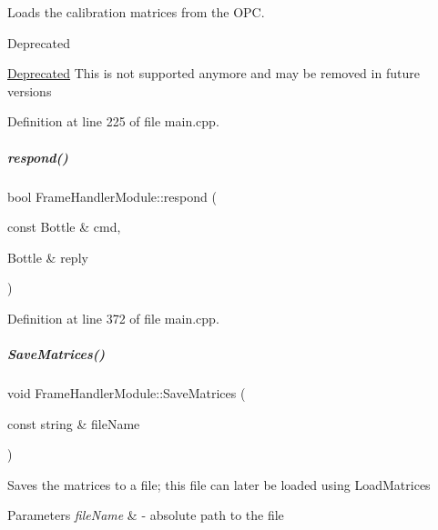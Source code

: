 Loads the calibration matrices from the O\+PC. 

\begin{DoxyRefDesc}{Deprecated}
\item[\hyperlink{deprecated__deprecated000001}{Deprecated}]This is not supported anymore and may be removed in future versions \end{DoxyRefDesc}


Definition at line 225 of file main.\+cpp.

\mbox{\label{group__referenceFrameHandler_ac511e77f51faf5ea84ed5162f3b4aed0}} 
\subparagraph{\texorpdfstring{respond()}{respond()}}
{\footnotesize\ttfamily bool Frame\+Handler\+Module\+::respond (\begin{DoxyParamCaption}\item[{const Bottle \&}]{cmd,  }\item[{Bottle \&}]{reply }\end{DoxyParamCaption})\hspace{0.3cm}{\ttfamily [inline]}}



Definition at line 372 of file main.\+cpp.

\mbox{\label{group__referenceFrameHandler_aac780e0eb6d561838faa32d0294bc135}} 
\subparagraph{\texorpdfstring{Save\+Matrices()}{SaveMatrices()}}
{\footnotesize\ttfamily void Frame\+Handler\+Module\+::\+Save\+Matrices (\begin{DoxyParamCaption}\item[{const string \&}]{file\+Name }\end{DoxyParamCaption})\hspace{0.3cm}{\ttfamily [inline]}}



Saves the matrices to a file; this file can later be loaded using {\ttfamily Load\+Matrices} 


\begin{DoxyParams}{Parameters}
{\em file\+Name} & -\/ absolute path to the file \\
\hline
\end{DoxyParams}


